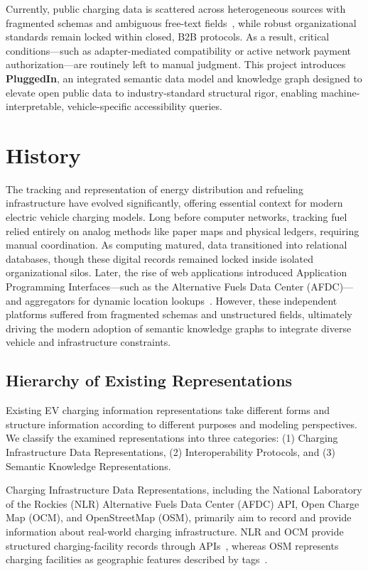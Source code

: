 \documentclass[sigconf]{acmart}
\begin{document}
Currently, public charging data is scattered across heterogeneous sources with fragmented schemas and ambiguous free-text fields~\cite{liu2025evca}, while robust organizational standards remain locked within closed, B2B protocols. As a result, critical conditions---such as adapter-mediated compatibility or active network payment authorization---are routinely left to manual judgment. This project introduces \textbf{PluggedIn}, an integrated semantic data model and knowledge graph designed to elevate open public data to industry-standard structural rigor, enabling machine-interpretable, vehicle-specific accessibility queries.

\section{History}
The tracking and representation of energy distribution and refueling infrastructure have evolved significantly, offering essential context for modern electric vehicle charging models. Long before computer networks, tracking fuel relied entirely on analog methods like paper maps and physical ledgers, requiring manual coordination. As computing matured, data transitioned into relational databases, though these digital records remained locked inside isolated organizational silos. Later, the rise of web applications introduced Application Programming Interfaces---such as the Alternative Fuels Data Center (AFDC)---and aggregators for dynamic location lookups~\cite{afdc_web}. However, these independent platforms suffered from fragmented schemas and unstructured fields, ultimately driving the modern adoption of semantic knowledge graphs to integrate diverse vehicle and infrastructure constraints.

\subsection{Hierarchy of Existing Representations}
Existing EV charging information representations take different forms and structure information according to different purposes and modeling perspectives. We classify the examined representations into three categories: (1) Charging Infrastructure Data Representations, (2) Interoperability Protocols, and (3) Semantic Knowledge Representations.

Charging Infrastructure Data Representations, including the National Laboratory of the Rockies (NLR) Alternative Fuels Data Center (AFDC) API, Open Charge Map (OCM), and OpenStreetMap (OSM), primarily aim to record and provide information about real-world charging infrastructure. NLR and OCM provide structured charging-facility records through APIs~\cite{nlr,ocm}, whereas OSM represents charging facilities as geographic features described by tags~\cite{osm}.
\end{document}
